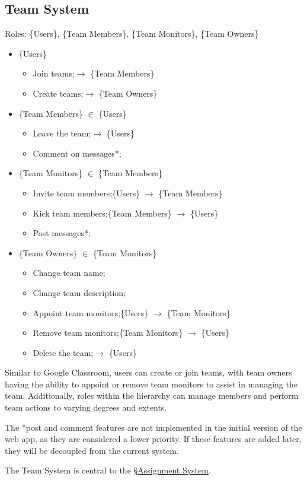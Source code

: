 \documentclass[12pt]{report}
\newcommand{\n}{\par}
\newcommand{\br}{\n\vspace{1 em}\n}
\begin{document}
\subsection{Team System} \label{overview.project-objectives.team-system}
Roles: \{Users\}, \{Team Members\}, \{Team Monitors\}, \{Team Owners\}\n
\begin{itemize}
	\item \{Users\}
	      \begin{itemize}
		      \item Join teams;\null\hfill $\rightarrow$ \{Team Members\}
		      \item Create teams;\null\hfill $\rightarrow$ \{Team Owners\}
	      \end{itemize}
	\item \{Team Members\} $\in$ \{Users\}
	      \begin{itemize}
		      \item Leave the team;\null\hfill $\rightarrow$ \{Users\}
		      \item Comment on messages*;
	      \end{itemize}
	\item \{Team Monitors\} $\in$ \{Team Members\}
	      \begin{itemize}
		      \item Invite team members;\null\hfill \{Users\} $\rightarrow$ \{Team Members\}
		      \item Kick team members;\null\hfill \{Team Members\} $\rightarrow$ \{Users\}
		      \item Post messages*;
	      \end{itemize}
	\item \{Team Owners\} $\in$ \{Team Monitors\}
	      \begin{itemize}
		      \item Change team name;
		      \item Change team description;
		      \item Appoint team monitors;\null\hfill \{Users\} $\rightarrow$ \{Team Monitors\}
		      \item Remove team monitors;\null\hfill \{Team Monitors\} $\rightarrow$ \{Users\}
		      \item Delete the team;\null\hfill $\rightarrow$ \{Users\}
	      \end{itemize}
\end{itemize}\n
Similar to Google Classroom, users can create or join teams,
with team owners having the ability to appoint or remove team monitors to assist in managing the team.
Additionally, roles within the hierarchy can manage members and perform team actions to varying degrees and extents.
\br
The *post and comment features are not implemented in the initial version of the web app, as they are considered a lower priority.
If these features are added later, they will be decoupled from the current system.
\br
The Team System is central to the \S \hyperref[overview.project-objectives.assignment-system]{Assignment System}.
\end{document}
